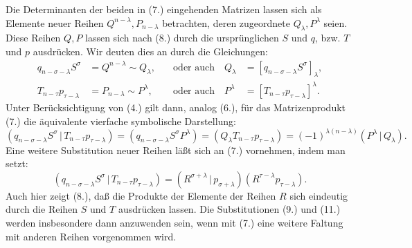 \documentclass[11pt]{article}
\providecommand{\pair}[2]{(#1\,|\,#2)}
\begin{document}
Die Determinanten der beiden in (7.) eingehenden Matrizen lassen sich als Elemente neuer Reihen $Q^{n-\lambda},P_{n-\lambda}$ betrachten, deren zugeordnete $Q_\lambda,P^\lambda$ seien. Diese Reihen $Q,P$ lassen sich nach (8.) durch die ursprünglichen $S$ und $q$, bzw. $T$ und $p$ ausdrücken. Wir deuten dies an durch die Gleichungen:
\begin{equation}
\begin{aligned}
 q_{n-\sigma-\lambda}S^\sigma&=Q^{n-\lambda}\sim Q_\lambda, &\quad\text{oder auch}\quad Q_\lambda&=[q_{n-\sigma-\lambda}S^\sigma]_\lambda,\\
 T_{n-\tau}p_{\tau-\lambda}&=P_{n-\lambda}\sim P^\lambda, &\quad\text{oder auch}\quad P^\lambda&=[T_{n-\tau}p_{\tau-\lambda}]^\lambda.
\end{aligned}
\tag{9}
\end{equation}
Unter Berücksichtigung von (4.) gilt dann, analog (6.), für das Matrizenprodukt (7.) die äquivalente vierfache symbolische Darstellung:
\begin{equation}
\pair{q_{n-\sigma-\lambda}S^\sigma}{T_{n-\tau}p_{\tau-\lambda}}
=(q_{n-\sigma-\lambda}S^\sigma P^\lambda)=(Q_\lambda T_{n-\tau}p_{\tau-\lambda})=(-1)^{\lambda(n-\lambda)}\pair{P^\lambda}{Q_\lambda}.
\tag{10}
\end{equation}
Eine weitere Substitution neuer Reihen läßt sich an (7.) vornehmen, indem man setzt:
\begin{equation}
 \pair{q_{n-\sigma-\lambda}S^\sigma}{T_{n-\tau}p_{\tau-\lambda}}
 =\pair{R^{\sigma+\lambda}}{p_{\sigma+\lambda}}(R^{\tau-\lambda}p_{\tau-\lambda}).
\tag{11}
\end{equation}
Auch hier zeigt (8.), daß die Produkte der Elemente der Reihen $R$ sich eindeutig durch die Reihen $S$ und $T$ ausdrücken lassen. Die Substitutionen (9.) und (11.) werden insbesondere dann anzuwenden sein, wenn mit (7.) eine weitere Faltung mit anderen Reihen vorgenommen wird.
\end{document}
